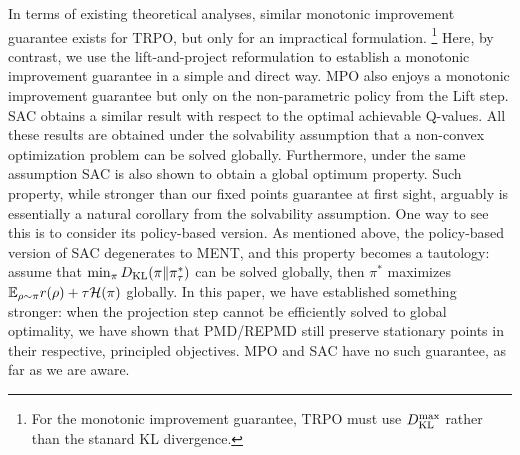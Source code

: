 In terms of existing theoretical analyses, 
similar monotonic improvement guarantee exists for TRPO, but only for an
impractical formulation.%
%
\footnote{
	For the monotonic improvement guarantee,
	TRPO must use $D_{\mathrm{KL}}^{\max} $ rather than the stanard KL divergence.
} 
Here, by contrast,
we use the lift-and-project reformulation to establish a monotonic
improvement guarantee in a simple and direct way.
MPO also enjoys a monotonic
improvement guarantee but only on the non-parametric policy from the Lift step.
SAC obtains a similar result with respect to the optimal achievable
Q-values.
All these results are obtained under the solvability assumption that a non-convex optimization problem can be solved globally.
Furthermore, under the same assumption SAC is also shown to obtain a global optimum property. 
Such property, while stronger than our fixed points guarantee at first sight, arguably is essentially a natural corollary from the solvability assumption.
One way to see this is to consider its policy-based version.
As mentioned above, the policy-based version of SAC degenerates to MENT,
and this property becomes a tautology: assume that $\min_\pi D_{\mathrm{KL}}(\pi \| \pi^*_\tau)$ can be solved globally, then $\pi^*$ maximizes $\mathbb{E}_{\rho \sim \pi} r(\rho) + \tau \mathcal{H}(\pi)$  globally.
In this paper, we have established something stronger:
when the projection step cannot be efficiently solved to global optimality,
we have shown that PMD/REPMD still preserve stationary points in 
their respective, principled objectives.
MPO and SAC have no such guarantee, as far as we are aware. 

